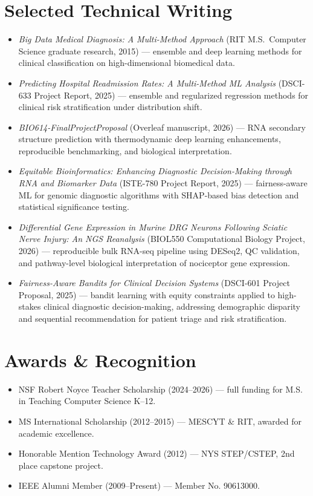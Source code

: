 \documentclass[11pt]{article}
\begin{document}
\section{Selected Technical Writing}
\begin{itemize}
  \item \textit{Big Data Medical Diagnosis: A Multi-Method Approach} (RIT M.S.\ Computer Science graduate research, 2015) --- ensemble and deep learning methods for clinical classification on high-dimensional biomedical data.
  \item \textit{Predicting Hospital Readmission Rates: A Multi-Method ML Analysis} (DSCI-633 Project Report, 2025) --- ensemble and regularized regression methods for clinical risk stratification under distribution shift.
  \item \textit{BIO614-FinalProjectProposal} (Overleaf manuscript, 2026) --- RNA secondary structure prediction with thermodynamic deep learning enhancements, reproducible benchmarking, and biological interpretation.
  \item \textit{Equitable Bioinformatics: Enhancing Diagnostic Decision-Making through RNA and Biomarker Data} (ISTE-780 Project Report, 2025) --- fairness-aware ML for genomic diagnostic algorithms with SHAP-based bias detection and statistical significance testing.
  \item \textit{Differential Gene Expression in Murine DRG Neurons Following Sciatic Nerve Injury: An NGS Reanalysis} (BIOL550 Computational Biology Project, 2026) --- reproducible bulk RNA-seq pipeline using DESeq2, QC validation, and pathway-level biological interpretation of nociceptor gene expression.
  \item \textit{Fairness-Aware Bandits for Clinical Decision Systems} (DSCI-601 Project Proposal, 2025) --- bandit learning with equity constraints applied to high-stakes clinical diagnostic decision-making, addressing demographic disparity and sequential recommendation for patient triage and risk stratification.
\end{itemize}

\section{Awards \& Recognition}
\begin{itemize}
  \item NSF Robert Noyce Teacher Scholarship (2024--2026) --- full funding for M.S. in Teaching Computer Science K--12.
  \item MS International Scholarship (2012--2015) --- MESCYT \& RIT, awarded for academic excellence.
  \item Honorable Mention Technology Award (2012) --- NYS STEP/CSTEP, 2nd place capstone project.
  \item IEEE Alumni Member (2009--Present) --- Member No. 90613000.
\end{itemize}
\end{document}
